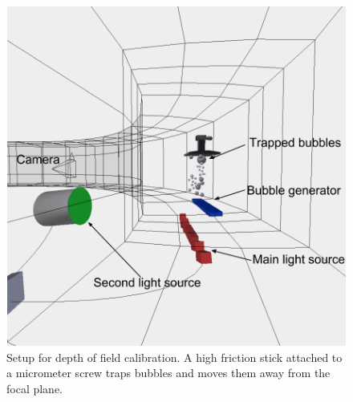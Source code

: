 			
			\begin{figure}
				\centering
				\includegraphics[scale=.5]{images/depth_of_field_setup.png}
				\caption{Setup for depth of field calibration. A high friction stick attached to a micrometer screw traps bubbles and moves them away from the focal plane.}
				\label{fig:depth_of_field_setup}
			\end{figure}
			
